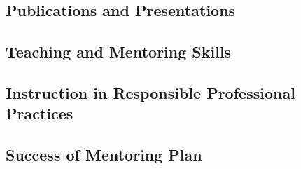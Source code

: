 \documentclass[../preamble.tex]{subfiles}
\begin{document}
\subsection{Publications and Presentations} %
\subsection{Teaching and Mentoring Skills} %
\subsection{Instruction in Responsible Professional Practices} %
\subsection{Success of Mentoring Plan} %
\end{document}
